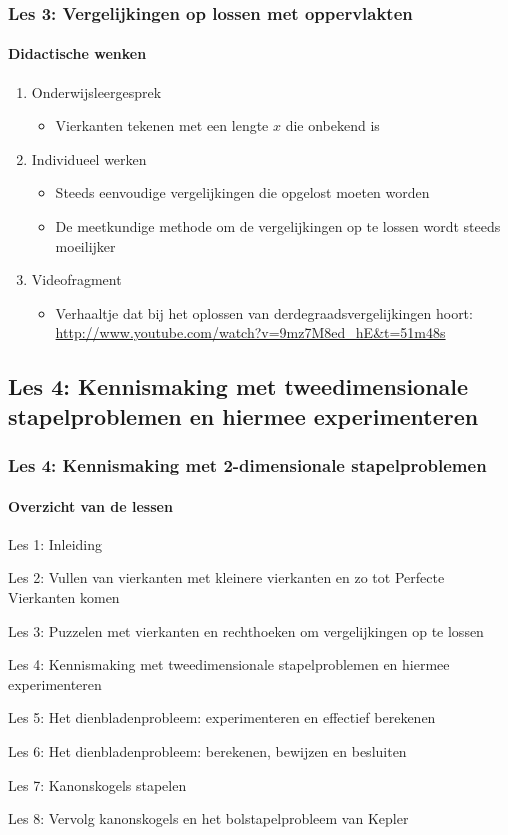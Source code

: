 \documentclass[dutch]{beamer}
\begin{document}
\begin{frame}
  \frametitle{Les 3: Vergelijkingen op lossen met oppervlakten}
  \framesubtitle{Didactische wenken}
  \begin{enumerate}
    \item Onderwijsleergesprek
      \begin{itemize}
        \item Vierkanten tekenen met een lengte $x$ die onbekend is
      \end{itemize}
    \item Individueel werken
      \begin{itemize}
        \item Steeds eenvoudige vergelijkingen die opgelost moeten worden
        \item De meetkundige methode om de vergelijkingen op te lossen wordt steeds moeilijker
      \end{itemize}
    \item Videofragment
      \begin{itemize}
        \item Verhaaltje dat bij het oplossen van derdegraadsvergelijkingen hoort:\\
          {\scriptsize \url{http://www.youtube.com/watch?v=9mz7M8ed_hE&t=51m48s}}
      \end{itemize}
  \end{enumerate}
\end{frame}



\subsection{Les 4: Kennismaking met tweedimensionale stapelproblemen en hiermee experimenteren}
\begin{frame}
\frametitle{Les 4: Kennismaking met 2-dimensionale stapelproblemen}
\framesubtitle{Overzicht van de lessen}
\begin{list}{\quad}{}
\item Les 1: Inleiding
\item Les 2: Vullen van vierkanten met kleinere vierkanten en zo tot Perfecte Vierkanten komen
\item Les 3: Puzzelen met vierkanten en rechthoeken om vergelijkingen op te lossen
\item {\color{blue}Les 4: Kennismaking met tweedimensionale stapelproblemen en hiermee experimenteren}
\item Les 5: Het dienbladenprobleem: experimenteren en effectief berekenen
\item Les 6: Het dienbladenprobleem: berekenen, bewijzen en besluiten
\item Les 7: Kanonskogels stapelen
\item Les 8: Vervolg kanonskogels en het bolstapelprobleem van Kepler
\end{list}
\end{frame}
\end{document}
